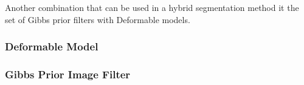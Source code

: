 Another combination that can be used in a hybrid segmentation method it the
set of Gibbs prior filters with Deformable models.

\subsubsection{Deformable Model}



\subsubsection{Gibbs Prior Image Filter}


